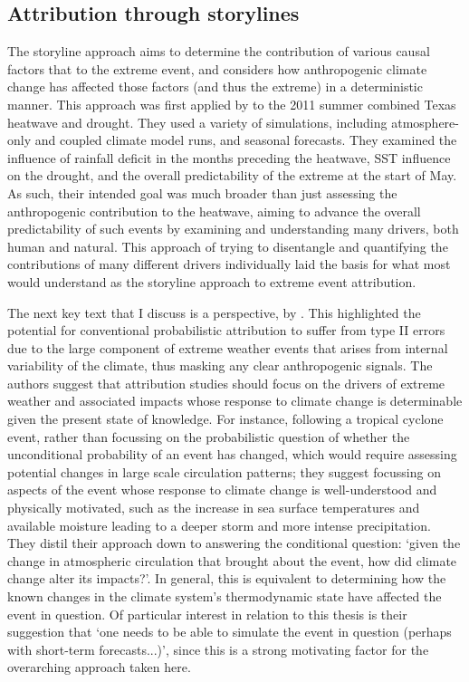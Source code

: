   \subsection{Attribution through storylines}

    The storyline approach \citep[or `Boulder' approach,][]{otto_attribution_2017} aims to determine the contribution of various causal factors that to the extreme event, and considers how anthropogenic climate change has affected those factors (and thus the extreme) in a deterministic manner. This approach was first applied by \citet{hoerling_anatomy_2013} to the 2011 summer combined Texas heatwave and drought. They used a variety of simulations, including atmosphere-only and coupled climate model runs, and seasonal forecasts. They examined the influence of rainfall deficit in the months preceding the heatwave, SST influence on the drought, and the overall predictability of the extreme at the start of May. As such, their intended goal was much broader than just assessing the anthropogenic contribution to the heatwave, aiming to advance the overall predictability of such events by examining and understanding many drivers, both human and natural. This approach of trying to disentangle and quantifying the contributions of many different drivers individually laid the basis for what most would understand as the storyline approach to extreme event attribution.

    The next key text that I discuss is a perspective,  by \citet{trenberth_attribution_2015}. This highlighted the potential for conventional probabilistic attribution to suffer from type II errors due to the large component of extreme weather events that arises from internal variability of the climate, thus masking any clear anthropogenic signals. The authors suggest that attribution studies should focus on the drivers of extreme weather and associated impacts whose response to climate change is determinable given the present state of knowledge. For instance, following a tropical cyclone event, rather than focussing on the probabilistic question of whether the unconditional probability of an event has changed, which would require assessing potential changes in large scale circulation patterns; they suggest focussing on aspects of the event whose response to climate change is well-understood and physically motivated, such as the increase in sea surface temperatures and available moisture leading to a deeper storm and more intense precipitation. They distil their approach down to answering the conditional question: `given the change in atmospheric circulation that brought about the event, how did climate change alter its impacts?'. In general, this is equivalent to determining how the known changes in the climate system's thermodynamic state have affected the event in question. Of particular interest in relation to this thesis is their suggestion that `one needs to be able to simulate the event in question (perhaps with short-term forecasts...)', since this is a strong motivating factor for the overarching approach taken here.

